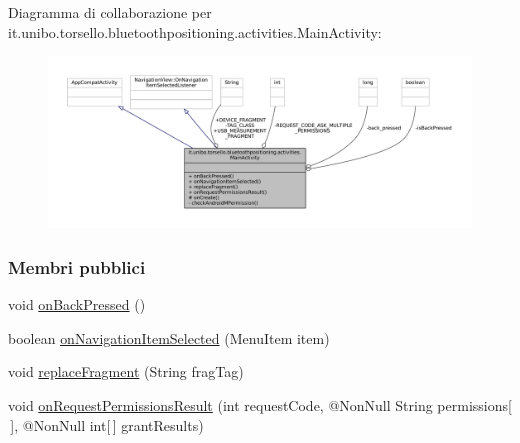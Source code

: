 Diagramma di collaborazione per it.\+unibo.\+torsello.\+bluetoothpositioning.\+activities.\+Main\+Activity\+:
\nopagebreak
\begin{figure}[H]
\begin{center}
\leavevmode
\includegraphics[width=350pt]{classit_1_1unibo_1_1torsello_1_1bluetoothpositioning_1_1activities_1_1MainActivity__coll__graph}
\end{center}
\end{figure}
\subsubsection*{Membri pubblici}
\begin{DoxyCompactItemize}
\item 
void \hyperlink{classit_1_1unibo_1_1torsello_1_1bluetoothpositioning_1_1activities_1_1MainActivity_ab0010b6d3fe518fabfea843626d7b5f1_ab0010b6d3fe518fabfea843626d7b5f1}{on\+Back\+Pressed} ()
\item 
boolean \hyperlink{classit_1_1unibo_1_1torsello_1_1bluetoothpositioning_1_1activities_1_1MainActivity_a7cfc0a2ee94c12afaac3b7472eeb75b7_a7cfc0a2ee94c12afaac3b7472eeb75b7}{on\+Navigation\+Item\+Selected} (Menu\+Item item)
\item 
void \hyperlink{classit_1_1unibo_1_1torsello_1_1bluetoothpositioning_1_1activities_1_1MainActivity_a98db4478d28cd91118138d0b652ceb2c_a98db4478d28cd91118138d0b652ceb2c}{replace\+Fragment} (String frag\+Tag)
\item 
void \hyperlink{classit_1_1unibo_1_1torsello_1_1bluetoothpositioning_1_1activities_1_1MainActivity_a81d7581dfa4998b2ad8139f103328cf9_a81d7581dfa4998b2ad8139f103328cf9}{on\+Request\+Permissions\+Result} (int request\+Code, @Non\+Null String permissions\mbox{[}$\,$\mbox{]}, @Non\+Null int\mbox{[}$\,$\mbox{]} grant\+Results)
\end{DoxyCompactItemize}
